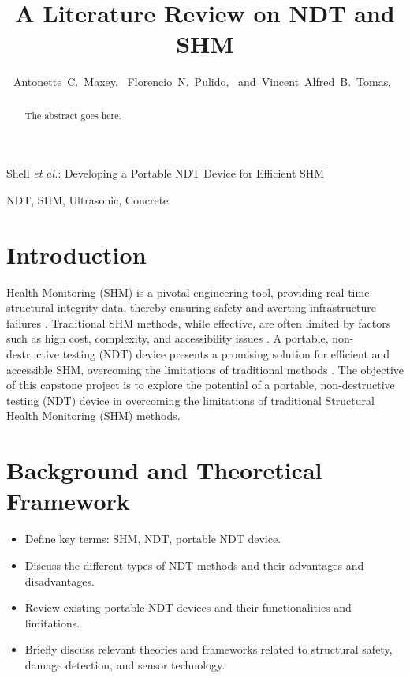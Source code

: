 \documentclass[journal, a4paper]{IEEEtran}
\begin{document}
\title{A Literature Review on NDT and SHM}


\author{Antonette~C.~Maxey,~
        Florencio~N.~Pulido,~
        and~Vincent~Alfred~B.~Tomas,~%
}



%
{Shell \MakeLowercase{\textit{et al.}}: Developing a Portable NDT Device for Efficient SHM}


\maketitle


\begin{abstract}
The abstract goes here. \lipsum[1]
\end{abstract}


\begin{IEEEkeywords}
  NDT, SHM, Ultrasonic, Concrete.
\end{IEEEkeywords}







\section{Introduction}
 Health Monitoring (SHM) is a pivotal engineering tool, providing real-time structural integrity data,
thereby ensuring safety and averting infrastructure failures \cite{Gharehbaghi2022} \cite{Katam2023}.
Traditional SHM methods, while effective, are often limited by factors such as
high cost, complexity, and accessibility issues \cite{Katam2023} \cite{Gharehbaghi2022}.
A portable, non-destructive testing (NDT) device presents a promising solution for efficient and accessible SHM,
overcoming the limitations of traditional methods \cite{Guo2022} \cite{Chen2023}.
The objective of this capstone project is to explore the potential of a portable,
non-destructive testing (NDT) device in overcoming the limitations of traditional Structural Health Monitoring (SHM) methods.


\section{Background and Theoretical Framework}
\begin{itemize}
  \item Define key terms: SHM, NDT, portable NDT device.
  \item Discuss the different types of NDT methods and their advantages and disadvantages.
  \item Review existing portable NDT devices and their functionalities and limitations.
  \item Briefly discuss relevant theories and frameworks related to structural safety, damage detection, and sensor technology.
\end{itemize}
\end{document}
